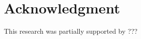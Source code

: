 \documentclass[conference]{IEEEtran}
\begin{document}



\section*{Acknowledgment}
This research was partially supported by ???



\end{document}
